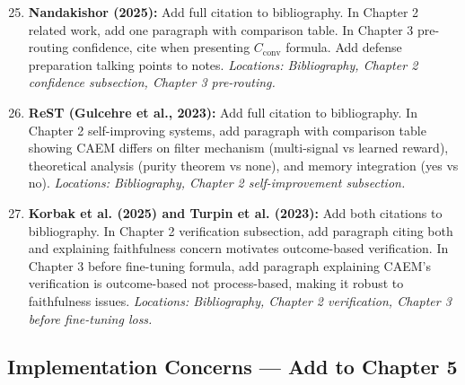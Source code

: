 \documentclass[11pt,a4paper]{article}
\newcommand{\Cconv}{C_{\text{conv}}}
\begin{document}
\begin{enumerate}
\setcounter{enumi}{24}
\item \textbf{Nandakishor (2025):} Add full citation to bibliography. In Chapter 2 related work, add one paragraph with comparison table. In Chapter 3 pre-routing confidence, cite when presenting $\Cconv$ formula. Add defense preparation talking points to notes. \textit{Locations: Bibliography, Chapter 2 confidence subsection, Chapter 3 pre-routing.}

\item \textbf{ReST (Gulcehre et al., 2023):} Add full citation to bibliography. In Chapter 2 self-improving systems, add paragraph with comparison table showing CAEM differs on filter mechanism (multi-signal vs learned reward), theoretical analysis (purity theorem vs none), and memory integration (yes vs no). \textit{Locations: Bibliography, Chapter 2 self-improvement subsection.}

\item \textbf{Korbak et al. (2025) and Turpin et al. (2023):} Add both citations to bibliography. In Chapter 2 verification subsection, add paragraph citing both and explaining faithfulness concern motivates outcome-based verification. In Chapter 3 before fine-tuning formula, add paragraph explaining CAEM's verification is outcome-based not process-based, making it robust to faithfulness issues. \textit{Locations: Bibliography, Chapter 2 verification, Chapter 3 before fine-tuning loss.}
\end{enumerate}

\subsection{Implementation Concerns — Add to Chapter 5}
\end{document}
